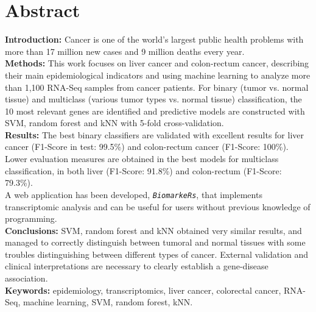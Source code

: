 \newpage
\thispagestyle{plain}

\section*{Abstract}

\textbf{Introduction:} Cancer is one of the world's largest public health problems with more than 17 million new cases and 9 million deaths every year. \\

\textbf{Methods:} This work focuses on liver cancer and colon-rectum cancer, describing their main epidemiological indicators and using machine learning to analyze more than 1,100 RNA-Seq samples from cancer patients. For binary (tumor vs. normal tissue) and multiclass (various tumor types vs. normal tissue) classification, the 10 most relevant genes are identified and predictive models are constructed with SVM, random forest and kNN with 5-fold cross-validation. \\

\textbf{Results:} The best binary classifiers are validated with excellent results for liver cancer (F1-Score in test: 99.5\%) and colon-rectum cancer (F1-Score: 100\%). Lower evaluation measures are obtained in the best models for multiclass classification, in both liver (F1-Score: 91.8\%) and colon-rectum (F1-Score: 79.3\%). \\

A web application has been developed, \texttt{\textit{BiomarkeRs}}, that implements transcriptomic analysis and can be useful for users without previous knowledge of programming. \\

\textbf {Conclusions:} SVM, random forest and kNN obtained very similar results, and managed to correctly distinguish between tumoral and normal tissues with some troubles distinguishing between different types of cancer. External validation and clinical interpretations are necessary to clearly establish a gene-disease association.\\


\textbf{Keywords:} epidemiology, transcriptomics, liver cancer, colorectal cancer, RNA-Seq, machine learning, SVM, random forest, kNN.

\newpage
\thispagestyle{empty}

